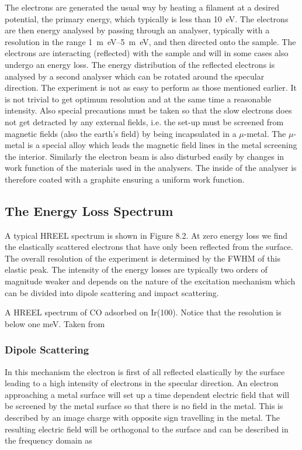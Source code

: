 \vspace{1cm}

The electrons are generated the usual way by heating a filament at a desired potential, the primary energy, which typically is less than \SI{10}{\electronvolt}. The electrons are then energy analysed by passing through an analyser, typically with a resolution in the range \SIrange{1}{5}{m\electronvolt}, and then  directed onto the sample. The electrons are interacting (reflected) with the sample and will in some cases also undergo an energy loss. The energy distribution of the reflected electrons is analysed by a second analyser which can be rotated around the specular direction. The experiment is not as easy to perform as those mentioned earlier. It is not trivial to get optimum resolution and at the same time a reasonable intensity. Also special precautions must be taken so that the slow electrons does not get detracted by any external fields, i.e. the set-up must be screened from magnetic fields (also the earth's field) by being incapsulated in a $\mu$-metal. The $\mu$-metal is a special alloy which leads the magnetic field lines in the metal screening the interior. Similarly the electron beam is also disturbed easily by changes in work function of the materials used in the analysers. The inside of the analyser is therefore coated with a graphite  ensuring a uniform work function.

\subsection{The Energy Loss Spectrum}
A typical HREEL spectrum is shown in Figure 8.2. At zero energy loss we find the elastically scattered electrons that have only been reflected from the surface. The overall resolution of the experiment is determined  by the FWHM of this elastic peak. The intensity of the energy losses are typically two orders of magnitude weaker and depends on the  nature of the excitation mechanism which can be  divided into dipole scattering and impact scattering.

\vspace*{11cm}

 A HREEL spectrum of CO adsorbed on Ir(100). Notice that the resolution is below one meV. Taken from \cite{Bruckmann}
\vspace{1cm}

\subsubsection{Dipole Scattering}
In this mechanism the electron is first of all reflected elastically by the surface leading to a high intensity of electrons in the specular direction. An electron approaching a metal surface will set up a time dependent electric field that will be screened by the metal surface so that there is no field in the metal. This is described by an image charge with opposite sign travelling in the metal. The resulting electric field will be orthogonal to the surface and can be described in the frequency domain as

